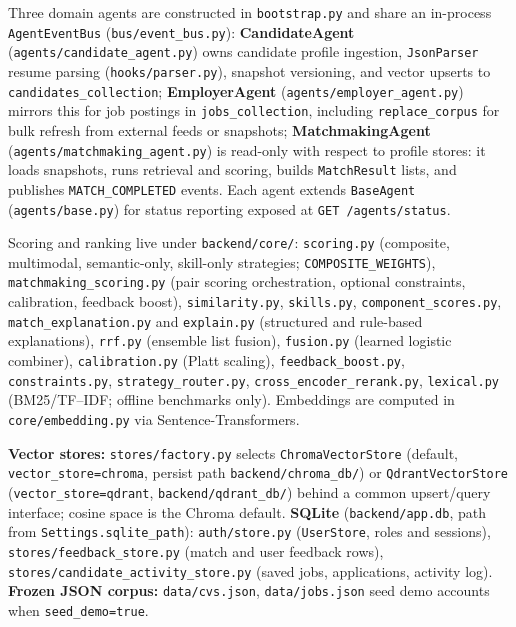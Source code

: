 Three domain agents are constructed in \texttt{bootstrap.py} and share an in-process \texttt{AgentEventBus} (\texttt{bus/event\_bus.py}):
\textbf{CandidateAgent} (\texttt{agents/candidate\_agent.py}) owns candidate profile ingestion, \texttt{JsonParser} resume parsing (\texttt{hooks/parser.py}), snapshot versioning, and vector upserts to \texttt{candidates\_collection};
\textbf{EmployerAgent} (\texttt{agents/employer\_agent.py}) mirrors this for job postings in \texttt{jobs\_collection}, including \texttt{replace\_corpus} for bulk refresh from external feeds or snapshots;
\textbf{MatchmakingAgent} (\texttt{agents/matchmaking\_agent.py}) is read-only with respect to profile stores: it loads snapshots, runs retrieval and scoring, builds \texttt{MatchResult} lists, and publishes \texttt{MATCH\_COMPLETED} events.
Each agent extends \texttt{BaseAgent} (\texttt{agents/base.py}) for status reporting exposed at \texttt{GET /agents/status}.

Scoring and ranking live under \texttt{backend/core/}:
\texttt{scoring.py} (composite, multimodal, semantic-only, skill-only strategies; \texttt{COMPOSITE\_WEIGHTS}),
\texttt{matchmaking\_scoring.py} (pair scoring orchestration, optional constraints, calibration, feedback boost),
\texttt{similarity.py}, \texttt{skills.py}, \texttt{component\_scores.py},
\texttt{match\_explanation.py} and \texttt{explain.py} (structured and rule-based explanations),
\texttt{rrf.py} (ensemble list fusion), \texttt{fusion.py} (learned logistic combiner),
\texttt{calibration.py} (Platt scaling), \texttt{feedback\_boost.py},
\texttt{constraints.py}, \texttt{strategy\_router.py}, \texttt{cross\_encoder\_rerank.py},
\texttt{lexical.py} (BM25/TF--IDF; offline benchmarks only).
Embeddings are computed in \texttt{core/embedding.py} via Sentence-Transformers.

\textbf{Vector stores:} \texttt{stores/factory.py} selects \texttt{ChromaVectorStore} (default, \texttt{vector\_store=chroma}, persist path \texttt{backend/chroma\_db/}) or \texttt{QdrantVectorStore} (\texttt{vector\_store=qdrant}, \texttt{backend/qdrant\_db/}) behind a common upsert/query interface; cosine space is the Chroma default.
\textbf{SQLite} (\texttt{backend/app.db}, path from \texttt{Settings.sqlite\_path}): \texttt{auth/store.py} (\texttt{UserStore}, roles and sessions), \texttt{stores/feedback\_store.py} (match and user feedback rows), \texttt{stores/candidate\_activity\_store.py} (saved jobs, applications, activity log).
\textbf{Frozen JSON corpus:} \texttt{data/cvs.json}, \texttt{data/jobs.json} seed demo accounts when \texttt{seed\_demo=true}.

